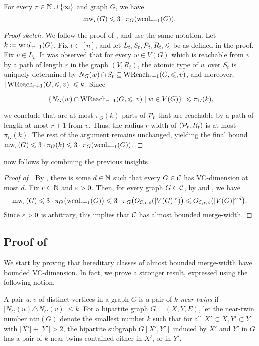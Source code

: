 \begin{lemma}\label{lem:wcol-poly}
    For every $r\in\N\cup\set{\infty}$ and graph $G$, we have
    $$\mw_r(G)\le 3\cdot\pi_G(\wcol_{r+1}(G)).$$
  \end{lemma}
  \begin{proof}[Proof sketch]
    We follow the proof of , and use the same notation. 
    Let \(k\coloneqq\wcol_{r+1}(G)\).
    Fix $t\in [n]$, and let $L_t,S_t,\cal P_t,R_t,\le$ be as defined in the proof.
    Fix $v\in L_t$.
    It was observed that for every $w\in V(G)$ which is reachable from $v$ by a path of length $r$
in the graph $(V,R_t)$, 
 the atomic type of $w$ over $S_t$ is uniquely 
determined by $N_G(w)\cap S_t \subseteq \wreach_{r+1}(G,\le,v)$,
and moreover, $|\wreach_{r+1}(G,\le,v)|\le k$.
Since $$\Big|\setof{N_G(w)\cap \wreach_{r+1}(G,\le,v)}{w\in V(G)}\Big|\le  \pi_G(k),$$
we conclude that are at most $\pi_G(k)$ parts of $\cal P_t$ 
that are reachable by a path of length at most $r+1$ from $v$.
Thus, the radius-$r$ width of $(\cal P_t,R_t)$ is at most
$\pi_G(k)$. The rest of the argument remains unchanged, yielding the final bound $\mw_r(G)\le 3\cdot \pi_G(k)\le 3\cdot \pi_G(\wcol_{r+1}(G))$.
  \end{proof}
  
   now follows by combining the previous insights.
  \begin{proof}[Proof of ]
    By , there is some $d\in\N$ such that every $G\in\CC$ has VC-dimension at most $d$.
    Fix $r\in\N$ and $\eps>0$.
Then, for every graph $G\in\CC$, by  and , we have 
$$\mw_r(G)\le 3\cdot \pi_G\bigl(\wcol_{r+1}(G)\bigr)\le  3\cdot \pi_G\bigl(O_{\CC,r,\eps}(|V(G)|^\eps)\bigr)\le O_{\CC,r,\eps}\bigl(|V(G)|^{\eps\cdot d}\bigr).$$
Since $\eps>0$ is arbitrary, this implies that $\CC$ has almost bounded merge-width.
  \end{proof}

  \subsection{Proof of }


We start by proving that hereditary classes of almost bounded merge-width have bounded VC-dimension. 
In fact, we prove a stronger result, expressed using the following notion.

\newcommand{\ntn}{\mathrm{ntn}}

A pair $u,v$ of distinct vertices in a graph $G$ is a pair of \emph{$k$-near-twins} if $|N_G(u)\triangle N_G(v)|\le k$.
 For a bipartite graph $G=(X,Y,E)$, let the near-twin number $\ntn(G)$ denote 
 the smallest number $k$ such that 
for all $X'\subset X,Y'\subset Y$ with $|X'|+|Y'|>2$,
the bipartite subgraph $G[X',Y']$ induced by $X'$ and $Y'$  in $G$
has a pair of $k$-near-twins contained either in $X'$, or in $Y'$.

